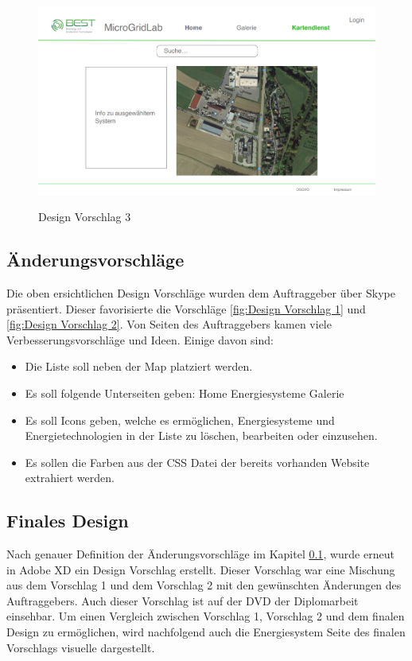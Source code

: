 \begin{figure}[h]
	\centering
	\includegraphics[height=7cm,width=12cm]{images/DesignVorschlag3}
	\caption{Design Vorschlag 3}
	\label{fig:Design Vorschlag 3}
\end{figure}
\subsection{Änderungsvorschläge} \label{sec:Änderungsvorschläge}
Die oben ersichtlichen Design Vorschläge wurden dem Auftraggeber über Skype präsentiert. Dieser favorisierte die Vorschläge \ref{fig:Design Vorschlag 1} und  \ref{fig:Design Vorschlag 2}. 
Von Seiten des Auftraggebers kamen viele Verbesserungsvorschläge und Ideen. Einige davon sind:
\begin{itemize}
	\item Die Liste soll neben der Map platziert werden.
	\item Es soll folgende Unterseiten geben:
	\subitem Home
	\subitem Energiesysteme
	\subitem Galerie
	\item Es soll Icons geben, welche es ermöglichen, Energiesysteme und Energietechnologien in der Liste zu löschen, bearbeiten oder einzusehen. 
	\item Es sollen die Farben aus der CSS Datei der bereits vorhanden Website extrahiert werden.
	
\end{itemize}


\subsection{Finales Design}
Nach genauer Definition der Änderungsvorschläge im Kapitel \ref{sec:Änderungsvorschläge}, wurde erneut in Adobe XD ein Design Vorschlag erstellt. Dieser Vorschlag war eine Mischung aus dem Vorschlag 1 und dem Vorschlag 2 mit den gewünschten Änderungen des Auftraggebers. Auch dieser Vorschlag ist auf der DVD der Diplomarbeit einsehbar. Um einen Vergleich zwischen Vorschlag 1, Vorschlag 2 und dem finalen Design zu ermöglichen, wird nachfolgend auch die Energiesystem Seite des finalen Vorschlags visuelle dargestellt.

